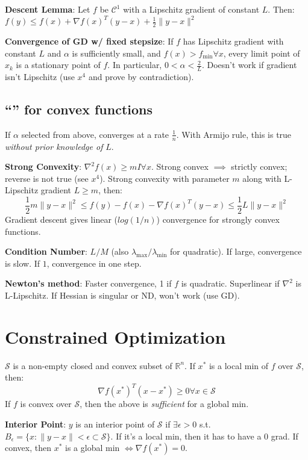 \documentclass[10pt,landscape]{article}
\begin{document}
\begin{multicols*}{\mycolnums}
    \noindent
    \textbf{Descent Lemma}: Let $f$ be $\mathcal{C}^1$ with a Lipschitz gradient of constant $L$.
    Then: $f(y)\leq f(x)+\nabla f(x)^T(y-x) + \frac{1}{2}\|y-x\|^2$

    \noindent
    \textbf{Convergence of GD w/ fixed stepsize}:
    If $f$ has Lipschitz gradient with constant $L$ and $\alpha$ is sufficiently small, and
    $f(x)>f_{\min}\forall x$, every limit point of ${x_k}$ is a stationary point of $f$. In particular,
    $0<\alpha<\frac{2}{L}$. Doesn't work if gradient isn't Lipschitz (use $x^4$ and prove by contradiction).

    \subsection*{``'' for convex functions}
    If $\alpha$ selected from above, converges at a rate $\frac{1}{n}$. With Armijo rule,
    this is true \textit{without prior knowledge of} $L$.

    \noindent
    \textbf{Strong Convexity}: $\nabla^2 f(x)\geq mI\forall x$. Strong convex $\implies$ strictly convex; reverse is not true
    (see $x^4$). Strong convexity with parameter $m$ along with L-Lipschitz gradient $L\geq m$, then:
    \[\frac{1}{2}m\|y-x\|^2\leq f(y)-f(x)-\nabla f(x)^T(y-x)\leq \frac{1}{2}L\|y-x\|^2\]
    Gradient descent gives linear ($log(1/n)$) convergence for strongly convex functions.

    \noindent
    \textbf{Condition Number}: $L/M$ (also $\lambda_{\max}/\lambda_{\min}$ for quadratic). If large, convergence is slow. If $1$, convergence in one step.

    \noindent
    \textbf{Newton's method}: Faster convergence, 1 if $f$ is quadratic. Superlinear if $\nabla^2$ is L-Lipschitz.
    If Hessian is singular or ND, won't work (use GD).

    \section*{Constrained Optimization}
    $\mathcal{S}$ is a non-empty closed and convex subset of $\mathbb{R}^n$.
    If $x^*$ is a local min of $f$ over $\mathcal{S}$, then:
    \[\nabla f(x^*)^T(x-x^*)\geq 0\forall x\in\mathcal{S}\]
    If $f$ is convex over $\mathcal{S}$, then the above is \textit{sufficient} for a global
    min.

    \noindent
    \textbf{Interior Point}:
    $y$ is an interior point of $\mathcal{S}$ if $\exists\epsilon>0$ s.t.
    $B_{\epsilon}=\{x:\|y-x\|<\epsilon\subset \mathcal{S}\}$. If it's a local min,
    then it has to have a 0 grad. If convex, then $x^*$ is a global min $\iff\nabla f(x^*)=0$.


\end{multicols*}
\end{document}
